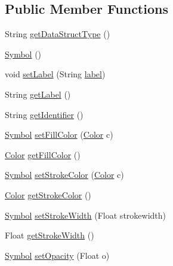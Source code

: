 \subsection*{Public Member Functions}
\begin{DoxyCompactItemize}
\item 
String \mbox{\hyperlink{classbridges_1_1base_1_1_symbol_abd8f06c176f61273acd56e91b150c11b}{get\+Data\+Struct\+Type}} ()
\item 
\mbox{\hyperlink{classbridges_1_1base_1_1_symbol_a5449cffb7ffdbab093a110957158acc6}{Symbol}} ()
\item 
void \mbox{\hyperlink{classbridges_1_1base_1_1_symbol_af6b944374cbd34334caac28d948a3f21}{set\+Label}} (String \mbox{\hyperlink{classbridges_1_1base_1_1_symbol_ad2adcc82e6a96c2f3c465702502655e9}{label}})
\item 
String \mbox{\hyperlink{classbridges_1_1base_1_1_symbol_a7616c25b288a6e464f4f0b5fe4bd2826}{get\+Label}} ()
\item 
String \mbox{\hyperlink{classbridges_1_1base_1_1_symbol_a53cea862b06ffc230ca68d4d34c8820d}{get\+Identifier}} ()
\item 
\mbox{\hyperlink{classbridges_1_1base_1_1_symbol}{Symbol}} \mbox{\hyperlink{classbridges_1_1base_1_1_symbol_ab9fa8c9df32ee0ded33146ef344943d7}{set\+Fill\+Color}} (\mbox{\hyperlink{classbridges_1_1base_1_1_color}{Color}} c)
\item 
\mbox{\hyperlink{classbridges_1_1base_1_1_color}{Color}} \mbox{\hyperlink{classbridges_1_1base_1_1_symbol_aed2e531266c8a3bc563709c6486380cc}{get\+Fill\+Color}} ()
\item 
\mbox{\hyperlink{classbridges_1_1base_1_1_symbol}{Symbol}} \mbox{\hyperlink{classbridges_1_1base_1_1_symbol_a10abfbf4651ffdc630121da84e23b116}{set\+Stroke\+Color}} (\mbox{\hyperlink{classbridges_1_1base_1_1_color}{Color}} c)
\item 
\mbox{\hyperlink{classbridges_1_1base_1_1_color}{Color}} \mbox{\hyperlink{classbridges_1_1base_1_1_symbol_abd38aaea2fc344adcc8096ed6eb8681c}{get\+Stroke\+Color}} ()
\item 
\mbox{\hyperlink{classbridges_1_1base_1_1_symbol}{Symbol}} \mbox{\hyperlink{classbridges_1_1base_1_1_symbol_a0d432410bcbee83060f064d69365bbea}{set\+Stroke\+Width}} (Float strokewidth)
\item 
Float \mbox{\hyperlink{classbridges_1_1base_1_1_symbol_aa9f4b8ed61cfd3a30dc979d53526ab4e}{get\+Stroke\+Width}} ()
\item 
\mbox{\hyperlink{classbridges_1_1base_1_1_symbol}{Symbol}} \mbox{\hyperlink{classbridges_1_1base_1_1_symbol_a1a0bf2838187440b3cf4b2a656eb3620}{set\+Opacity}} (Float o)

\end{DoxyCompactItemize}
